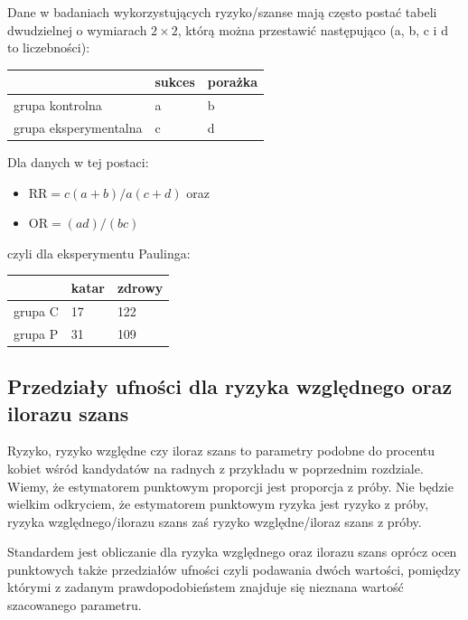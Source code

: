 \documentclass[
  openany]{book}
\providecommand{\tightlist}{%
  \setlength{\itemsep}{0pt}\setlength{\parskip}{0pt}}
\begin{document}
Dane w badaniach wykorzystujących ryzyko/szanse mają często postać tabeli
dwudzielnej o wymiarach \(2\times 2\), którą można przestawić następująco
(a, b, c i d to liczebności):

\begin{longtable}[]{@{}lll@{}}
\toprule\noalign{}
& sukces & porażka \\
\midrule\noalign{}
\endhead
\bottomrule\noalign{}
\endlastfoot
grupa kontrolna & a & b \\
grupa eksperymentalna & c & d \\
\end{longtable}

Dla danych w tej postaci:

\begin{itemize}
\tightlist
\item
  \(\textrm{RR} = c(a+b)/a(c+d)\) oraz
\item
  \(\textrm{OR} = (ad)/ (bc)\)
\end{itemize}

czyli dla eksperymentu Paulinga:

\begin{longtable}[]{@{}lll@{}}
\toprule\noalign{}
& katar & zdrowy \\
\midrule\noalign{}
\endhead
\bottomrule\noalign{}
\endlastfoot
grupa C & 17 & 122 \\
grupa P & 31 & 109 \\
\end{longtable}

\hypertarget{przedziaux142y-ufnoux15bci-dla-ryzyka-wzglux119dnego-oraz-ilorazu-szans}{%
\subsection{Przedziały ufności dla ryzyka względnego oraz ilorazu szans}\label{przedziaux142y-ufnoux15bci-dla-ryzyka-wzglux119dnego-oraz-ilorazu-szans}}

Ryzyko, ryzyko względne czy iloraz szans to parametry podobne do procentu kobiet
wśród kandydatów na radnych z przykładu w poprzednim rozdziale. Wiemy,
że estymatorem punktowym proporcji jest proporcja z próby. Nie będzie
wielkim odkryciem, że estymatorem punktowym ryzyka jest ryzyko z próby,
ryzyka względnego/ilorazu szans zaś ryzyko względne/iloraz szans z próby.

Standardem jest obliczanie dla ryzyka względnego oraz ilorazu szans
oprócz ocen punktowych także
przedziałów ufności czyli podawania dwóch wartości, pomiędzy którymi
z zadanym prawdopodobieństem znajduje się nieznana wartość szacowanego
parametru.
\end{document}
